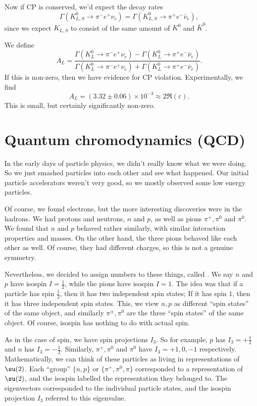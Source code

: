 \documentclass[a4paper]{article}
\begin{document}
Now if CP is conserved, we'd expect the decay rates
\[
  \Gamma(K_{L, S}^0 \to \pi^- e^+ \nu_e) = \Gamma(K_{L, S}^0 \to \pi^+ e^- \bar{\nu}_e),
\]
since we expect $K_{L, S}$ to consist of the same amount of $K^0$ and $\bar{K}^0$.

We define
\[
  A_L = \frac{\Gamma(K_L^0 \to \pi^- e^+ \nu_e) - \Gamma(K_L^0 \to \pi^+ e^- \bar{\nu}_e)}{\Gamma(K_L^0 \to \pi^- e^+ \nu_e) + \Gamma(K_L^0 \to \pi^+ e^- \bar{\nu}_e)}.
\]
If this is non-zero, then we have evidence for CP violation. Experimentally, we find
\[
  A_L = (3.32 \pm 0.06) \times 10^{-3} \approx 2 \Re (\varepsilon).
\]
This is small, but certainly significantly non-zero.


\section{Quantum chromodynamics (QCD)}
In the early days of particle physics, we didn't really know what we were doing. So we just smashed particles into each other and see what happened. Our initial particle accelerators weren't very good, so we mostly observed some low energy particles.

Of course, we found electrons, but the more interesting discoveries were in the hadrons. We had protons and neutrons, $n$ and $p$, as well as pions $\pi^+, \pi^0$ and $\pi^0$. We found that $n$ and $p$ behaved rather similarly, with similar interaction properties and masses. On the other hand, the three pions behaved like each other as well. Of course, they had different charges, so this is not a genuine symmetry.

Nevertheless, we decided to assign numbers to these things, called . We say $n$ and $p$ have isospin $I = \frac{1}{2}$, while the pions have isospin $I = 1$. The idea was that if a particle has spin $\frac{1}{2}$, then it has two independent spin states; If it has spin $1$, then it has three independent spin states. This, we view $n, p$ as different ``spin states'' of the same object, and similarly $\pi^{\pm}, \pi^0$ are the three ``spin states'' of the same object.  Of course, isospin has nothing to do with actual spin.

As in the case of spin, we have spin projections $I_3$. So for example, $p$ has $I_3 = + \frac{1}{2}$ and $n$ has $I_3 = -\frac{1}{2}$. Similarly, $\pi^+, \pi^0$ and $\pi^0$ have $I_3 = +1, 0, -1$ respectively. Mathematically, we can think of these particles as living in representations of $\su(2)$. Each ``group'' $\{n, p\}$ or $\{\pi^+, \pi^0, \pi\}$ corresponded to a representation of $\su(2)$, and the isospin labelled the representation they belonged to. The eigenvectors corresponded to the individual particle states, and the isospin projection $I_3$ referred to this eigenvalue.
\end{document}
